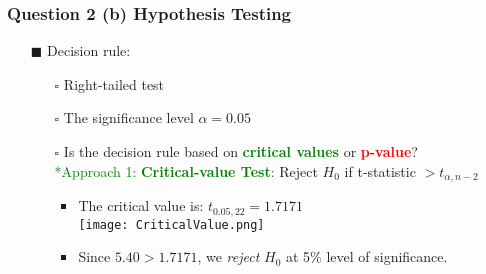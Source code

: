 \documentclass[11pt, xcolor=x11names,compress]{beamer}
\begin{document}
\begin{frame}[fragile,t]
\frametitle{Question 2 (b) Hypothesis Testing} 
\linespread{1.15}
\begin{itemize}
    \item [$\blacksquare$] Decision rule:
    \begin{itemize}
        \item [$\square$] Right-tailed test 
        \item [$\square$] The significance level $\alpha = 0.05$
        \item [$\square$] Is the decision rule based on \textcolor{green}{\textbf{critical values}} or \textcolor{red}{\textbf{p-value}}?\\
        \vspace{2mm}
        \textcolor{green}{*Approach 1: \textbf{Critical-value Test}:} Reject $H_0$ if t-statistic $> t_{\alpha,n-2}$
        \begin{itemize}
            \item The critical value is: $t_{0.05,22} = 1.7171$ \\
            \vspace{2mm}
            \texttt{[image: CriticalValue.png]}
            \vspace{3mm}
            \item Since $5.40 > 1.7171$, we \textit{reject }$H_0$ at 5\% level of significance.
            \end{itemize}
    \end{itemize}
\end{itemize}
\end{frame}
\end{document}
